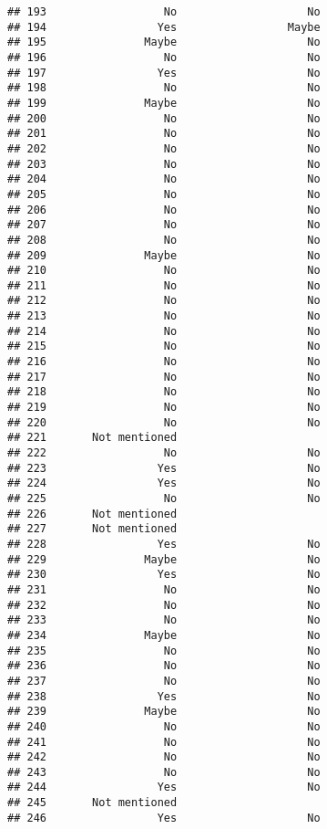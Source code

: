 \documentclass[
]{article}
\begin{document}
\begin{verbatim}
## 193                  No                    No
## 194                 Yes                 Maybe
## 195               Maybe                    No
## 196                  No                    No
## 197                 Yes                    No
## 198                  No                    No
## 199               Maybe                    No
## 200                  No                    No
## 201                  No                    No
## 202                  No                    No
## 203                  No                    No
## 204                  No                    No
## 205                  No                    No
## 206                  No                    No
## 207                  No                    No
## 208                  No                    No
## 209               Maybe                    No
## 210                  No                    No
## 211                  No                    No
## 212                  No                    No
## 213                  No                    No
## 214                  No                    No
## 215                  No                    No
## 216                  No                    No
## 217                  No                    No
## 218                  No                    No
## 219                  No                    No
## 220                  No                    No
## 221       Not mentioned                      
## 222                  No                    No
## 223                 Yes                    No
## 224                 Yes                    No
## 225                  No                    No
## 226       Not mentioned                      
## 227       Not mentioned                      
## 228                 Yes                    No
## 229               Maybe                    No
## 230                 Yes                    No
## 231                  No                    No
## 232                  No                    No
## 233                  No                    No
## 234               Maybe                    No
## 235                  No                    No
## 236                  No                    No
## 237                  No                    No
## 238                 Yes                    No
## 239               Maybe                    No
## 240                  No                    No
## 241                  No                    No
## 242                  No                    No
## 243                  No                    No
## 244                 Yes                    No
## 245       Not mentioned                      
## 246                 Yes                    No

\end{verbatim}
\end{document}
